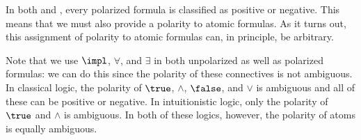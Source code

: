 \documentclass{llncs}
\begin{document}

In both \LKF and \LJF, every polarized formula is classified as
positive or negative.
%
This means that we must also provide a polarity to atomic formulas.
%
As it turns out, this assignment of polarity to atomic formulas can,
in principle, be arbitrary.
%

%
Note that we use $\impl$, $\forall$, and $\exists$ in both unpolarized
as well as polarized formulas: we can do this since the polarity of
these connectives is not ambiguous.
%
In classical logic, the polarity of $\true$, $\wedge$, $\false$, and
$\vee$ is ambiguous and all of these can be positive or negative.
%
In intuitionistic logic, only the polarity of $\true$ and $\wedge$
is ambiguous.
%
In both of these logics, however, the polarity of atoms is equally
ambiguous.
%
\end{document}
